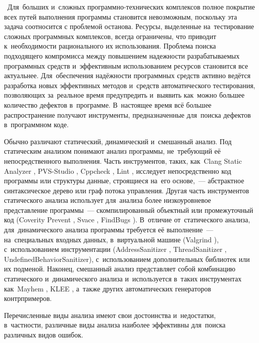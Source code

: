 \actuality\
Для~больших и~сложных программно-технических комплексов полное покрытие всех путей выполнения программы становится невозможным, поскольку эта задача соотносится с проблемой останова. Ресурсы, выделенные на~тестирование сложных программных комплексов, всегда ограничены, что приводит к~необходимости рационального  их использования. Проблема поиска подходящего компромисса  между повышением надежности разрабатываемых программных средств и~эффективным использованием ресурсов становится все актуальнее. Для~обеспечения надёжности программных средств  активно ведётся разработка новых эффективных методов и~средств автоматического тестирования, позволяющих за~реальное время предупредить и~выявить как~можно большее количество дефектов в~программе. В~настоящее время всё большее распространение получают инструменты, предназначенные для~поиска дефектов в~программном коде.

Обычно различают статический, динамический и~смешанный анализ. Под статическим анализом понимают анализ программы, не~требующий её непосредственного выполнения. Часть инструментов, таких, как~Clang Static Analyzer \cite{csa}, PVS-Studio \cite{pvs}, Cppcheck \cite{cppcheck}, Lint \cite{lint}, исследует непосредственно код программы или структуры данные, строящиеся на~его основе,~--- абстрактное синтаксическое дерево или граф потока управления. Другая часть инструментов статического анализа использует для~анализа более низкоуровневое представление программы~--- скомпилированный объектный или промежуточный код (Coverity Prevent \cite{coverity}, Svace \cite{svace}, FindBugs \cite{findbugs}). В~отличие от~статического анализа, для~динамического анализа программы требуется её выполнение~--- на~специальных входных данных, в~виртуальной машине (Valgrind \cite{valgrind}), с~использованием инструментации (AddressSanitizer \cite{asan}, ThreadSanitizer \cite{tsan}, UndefinedBehaviorSanitizer), с~использованием дополнительных библиотек или их подменой. Наконец, смешанный анализ представляет собой комбинацию статического и~динамического анализа и~используется в~таких инструментах как~Mayhem \cite{mayhem}, KLEE \cite{klee}, а~также других автоматических генераторов контрпримеров.

Перечисленные виды анализа имеют свои достоинства и~недостатки, в~частности, различные виды анализа наиболее эффективны для~поиска различных видов ошибок.

